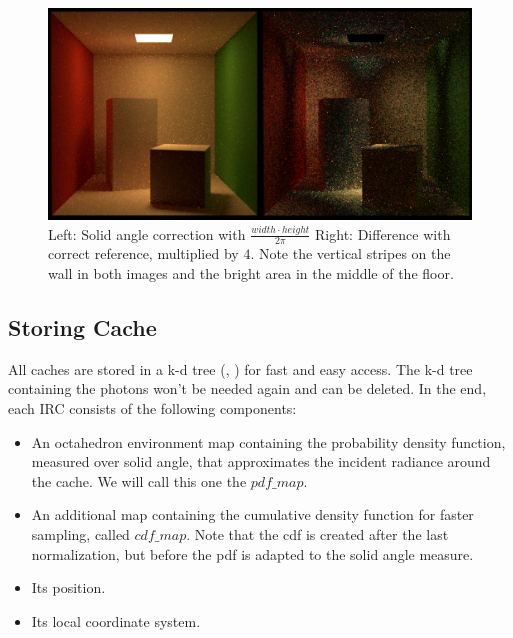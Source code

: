 \begin{figure}[h!]
	\centering
\includegraphics[width=1\textwidth]{bilder/solid_angle_difference.png}
\caption{Left: Solid angle correction with $\frac{width \cdot height}{2\pi}$\newline
Right: Difference with correct reference, multiplied by $4$. Note the vertical stripes on the wall in both images and the bright area in the middle of the floor.}
\label{solid_angle_korrektur}
\end{figure}

\clearpage
\subsection{Storing Cache}
\label{storing cache}
All caches are stored in a k-d tree (\cite{kdref1}, \cite{nanoflann}) for fast and easy access. The k-d tree containing the photons won't be needed again and can be deleted.
In the end, each IRC consists of the following components:
\begin{itemize}
\item An octahedron environment map containing the probability density function, measured over solid angle, that approximates the incident radiance around the cache. We will call this one the $pdf\_map$.
\item An additional map containing the cumulative density function for faster sampling, called $cdf\_map$. Note that the cdf is created after the last normalization, but before the pdf is adapted to the solid angle measure.
\item Its position.
\item Its local coordinate system.
\end{itemize}